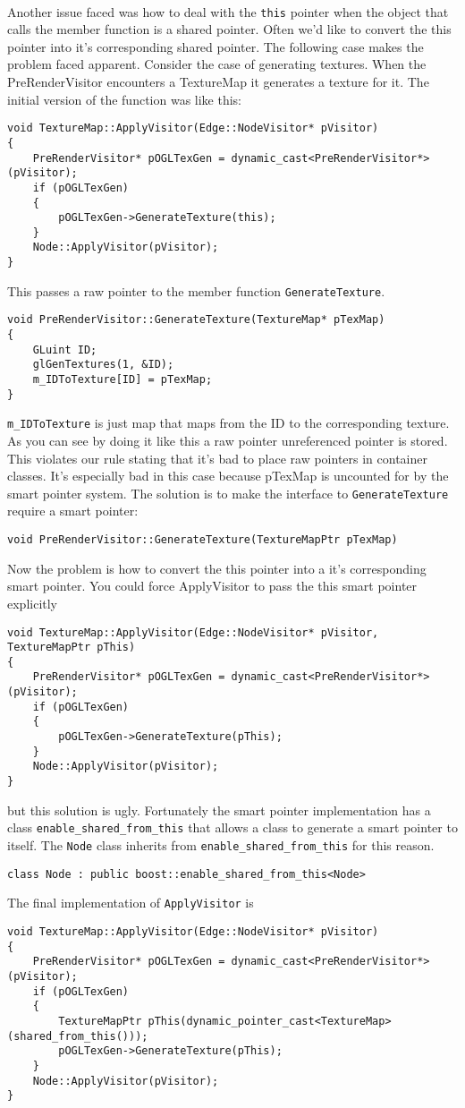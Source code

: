 \documentclass{article}
\begin{document}
\paragraph{}
Another issue faced was how to deal with the \verb|this| pointer when the object
that calls the member function is a shared pointer. Often we'd like to convert the this
pointer into it's corresponding shared pointer. The following case makes the
problem faced apparent. Consider the case of generating textures. When
the PreRenderVisitor encounters a TextureMap it generates a texture for it. The
initial version of the function was like this:
\begin{verbatim}
void TextureMap::ApplyVisitor(Edge::NodeVisitor* pVisitor)
{
    PreRenderVisitor* pOGLTexGen = dynamic_cast<PreRenderVisitor*>(pVisitor);
    if (pOGLTexGen)
    {
        pOGLTexGen->GenerateTexture(this);
    }
    Node::ApplyVisitor(pVisitor);
}
\end{verbatim}
This passes a raw pointer to the member function \verb|GenerateTexture|.
\begin{verbatim}
void PreRenderVisitor::GenerateTexture(TextureMap* pTexMap)
{
    GLuint ID;	
    glGenTextures(1, &ID);
    m_IDToTexture[ID] = pTexMap;
}
\end{verbatim}
\verb|m_IDToTexture| is just map that maps from the ID to the corresponding
texture. As you can see by doing it like this a raw pointer unreferenced pointer
is stored. This violates our rule stating that it's bad to place raw pointers in
container classes. It's especially bad in this case because pTexMap is uncounted
for by the smart pointer system. The solution is to make the interface
to \verb|GenerateTexture| require a smart pointer:
\begin{verbatim}
void PreRenderVisitor::GenerateTexture(TextureMapPtr pTexMap)
\end{verbatim}
Now the problem is how to convert the this pointer into a it's corresponding
smart pointer. You could force ApplyVisitor to pass the this smart pointer
explicitly 
\begin{verbatim}
void TextureMap::ApplyVisitor(Edge::NodeVisitor* pVisitor, TextureMapPtr pThis)
{
    PreRenderVisitor* pOGLTexGen = dynamic_cast<PreRenderVisitor*>(pVisitor);
    if (pOGLTexGen)
    {
        pOGLTexGen->GenerateTexture(pThis);
    }
    Node::ApplyVisitor(pVisitor);
}
\end{verbatim}
but this solution is ugly. Fortunately the smart pointer implementation has a class 
\verb|enable_shared_from_this| that allows a class to generate a smart pointer
to itself. The \verb|Node| class inherits from \verb|enable_shared_from_this|
for this reason. 
\begin{verbatim}
class Node : public boost::enable_shared_from_this<Node>
\end{verbatim}
The final implementation of \verb|ApplyVisitor| is
\begin{verbatim}
void TextureMap::ApplyVisitor(Edge::NodeVisitor* pVisitor)
{
    PreRenderVisitor* pOGLTexGen = dynamic_cast<PreRenderVisitor*>(pVisitor);
    if (pOGLTexGen)
    {
        TextureMapPtr pThis(dynamic_pointer_cast<TextureMap>(shared_from_this()));
        pOGLTexGen->GenerateTexture(pThis);
    }
    Node::ApplyVisitor(pVisitor);
}  
\end{verbatim}
\end{document}
